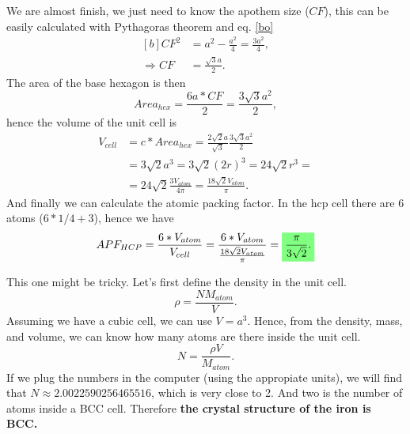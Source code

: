 \begin{questions}
\begin{solution}
We are almost finish, we just need to know the apothem size ($CF$), this can be easily calculated with Pythagoras theorem and eq. \ref{bo}
\begin{equation}
  \begin{aligned}[b]
    CF^2 &= a^2 - \frac{a^2}{4} = \frac{3a^2}{4},\\
    \Rightarrow CF &= \frac{\sqrt{3}a}{2}.
  \end{aligned}
\end{equation}
The area of the base hexagon is then
\begin{equation}
  Area_{hex} = \frac{6a*CF}{2} =  \frac{3\sqrt{3}a^2}{2},
\end{equation}
hence the volume of the unit cell is
\begin{equation}
  \begin{aligned}
    V_{cell} &= c*Area_{hex} = \frac{2\sqrt{2}a}{\sqrt{3}}\frac{3\sqrt{3}a^2}{2} \\  &= 3\sqrt{2}a^3 = 3\sqrt{2}(2r)^3 = 24\sqrt{2}r^3 = \\
     &=24\sqrt{2}\frac{3V_{atom}}{4\pi} = \frac{18\sqrt{2}V_{atom}}{\pi}.
  \end{aligned}
\end{equation}
And finally we can calculate the atomic packing factor. In the hcp cell there are 6 atoms ($6*1/4 + 3$), hence we have
\begin{equation}
  APF_{HCP} = \frac{6*V_{atom}}{V_{cell}} = \frac{6*V_{atom}}{\frac{18\sqrt{2}V_{atom}}{\pi}} = \hlgreen{\frac{\pi}{3\sqrt{2}}.}
\end{equation}
\end{solution}

\begin{solution}
  This one might be tricky. Let's first define the density in the unit cell.
  \begin{equation}
    \rho = \frac{N M_{atom}}{V}.
  \end{equation}
  Assuming we have a cubic cell, we can use $V=a^3$. Hence, from the density, mass, and volume, we can know how many atoms are there inside the unit cell.
  \begin{equation}
    N = \frac{\rho V}{M_{atom}}.
  \end{equation}
  If we plug the numbers in the computer (using the appropiate units), we will find that $N\approx2.0022590256465516$, which is very close to 2. And two is the number of atoms inside a BCC cell. Therefore \textbf{the crystal structure of the iron is BCC.}
\end{solution}
\end{questions}
